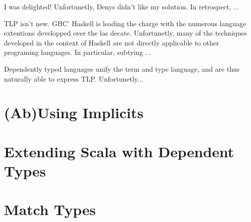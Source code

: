 \memImplicitMainCodeSection

I was delighted! Unfortunetly, Denys didn't like my solution. In retrospect, ...

TLP isn't new. GHC' Haskell is leading the charge with the numerous language extentions developped over the las decate. Unfortunetly, many of the techniques developed in the context of Haskell are not directly applicable to other programing languages. In particular, subtying ...

Dependently typed languages unify the term and type language, and are thus naturally able to express TLP. Unfortunetly...






\lipsum[1]

\chapter{(Ab)Using Implicits}
\lipsum[1]

\chapter{Extending Scala with Dependent Types}
\lipsum[1]

\chapter{Match Types}


